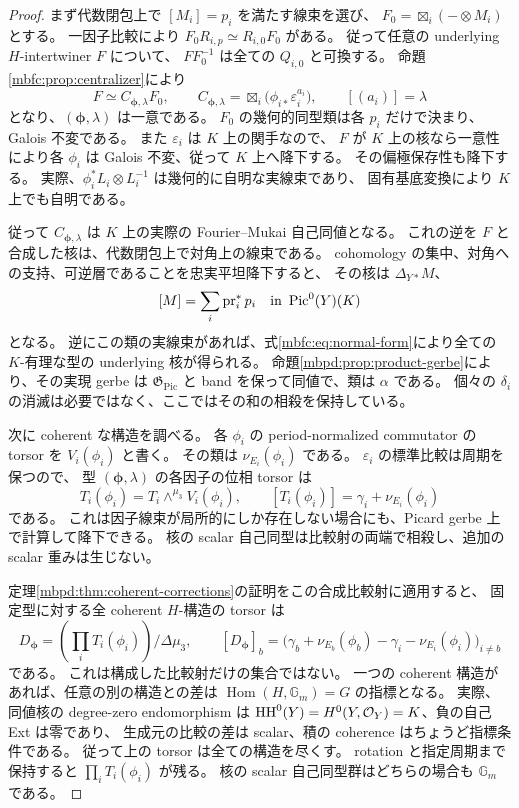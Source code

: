 \begin{proof}
まず代数閉包上で $[M_i]=p_i$ を満たす線束を選び、
$F_0=\boxtimes_i(-\otimes M_i)$ とする。
一因子比較により $F_0R_{i,p}\simeq R_{i,0}F_0$ がある。
従って任意の underlying $H$-intertwiner $F$ について、
$FF_0^{-1}$ は全ての $Q_{i,0}$ と可換する。
命題\ref{mbfc:prop:centralizer}により
\begin{equation}\label{mbfc:eq:normal-form}
 F\simeq C_{\boldsymbol\phi,\lambda}F_0,
 \qquad
 C_{\boldsymbol\phi,\lambda}
    =\boxtimes_i\bigl(\phi_{i*}\varepsilon_i^{a_i}\bigr),
 \qquad[(a_i)]=\lambda
\end{equation}
となり、$(\boldsymbol\phi,\lambda)$ は一意である。
$F_0$ の幾何的同型類は各 $p_i$ だけで決まり、Galois 不変である。
また $\varepsilon_i$ は $K$ 上の関手なので、
$F$ が $K$ 上の核なら一意性により各 $\phi_i$ は Galois 不変、従って $K$ 上へ降下する。
その偏極保存性も降下する。
実際、$\phi_i^*L_i\otimes L_i^{-1}$ は幾何的に自明な実線束であり、
固有基底変換により $K$ 上でも自明である。

従って $C_{\boldsymbol\phi,\lambda}$ は $K$ 上の実際の Fourier--Mukai 自己同値となる。
これの逆を $F$ と合成した核は、代数閉包上で対角上の線束である。
cohomology の集中、対角への支持、可逆層であることを忠実平坦降下すると、
その核は $\Delta_{Y*}M$、
\[
 [M]=\sum_i\operatorname{pr}_i^*p_i\quad\text{in }\operatorname{Pic}^0(Y)(K)
\]
となる。
逆にこの類の実線束があれば、式\eqref{mbfc:eq:normal-form}により全ての
$K$-有理な型の underlying 核が得られる。
命題\ref{mbpd:prop:product-gerbe}により、その実現 gerbe は
$\mathfrak G_{\mathrm{Pic}}$ と band を保って同値で、類は $\alpha$ である。
個々の $\delta_i$ の消滅は必要ではなく、ここではその和の相殺を保持している。

次に coherent な構造を調べる。
各 $\phi_i$ の period-normalized commutator の torsor を $V_i(\phi_i)$ と書く。
その類は $\nu_{E_i}(\phi_i)$ である。
$\varepsilon_i$ の標準比較は周期を保つので、
型 $(\boldsymbol\phi,\lambda)$ の各因子の位相 torsor は
\[
 T_i(\phi_i)=T_i\mathbin{\wedge^{\mu_3}}V_i(\phi_i),
 \qquad [T_i(\phi_i)]=\gamma_i+\nu_{E_i}(\phi_i)
\]
である。
これは因子線束が局所的にしか存在しない場合にも、Picard gerbe 上で計算して降下できる。
核の scalar 自己同型は比較射の両端で相殺し、追加の scalar 重みは生じない。

定理\ref{mbpd:thm:coherent-corrections}の証明をこの合成比較射に適用すると、
固定型に対する全 coherent $H$-構造の torsor は
\[
 D_{\boldsymbol\phi}
   =\left(\prod_i T_i(\phi_i)\right)/\Delta\mu_3,
 \qquad
 [D_{\boldsymbol\phi}]_b
   =\bigl(\gamma_b+\nu_{E_b}(\phi_b)
          -\gamma_i-\nu_{E_i}(\phi_i)\bigr)_{i\ne b}
\]
である。
これは構成した比較射だけの集合ではない。
一つの coherent 構造があれば、任意の別の構造との差は
$\operatorname{Hom}(H,\mathbb G_m)=G$ の指標となる。
実際、同値核の degree-zero endomorphism は
$\mathrm{HH}^0(Y)=H^0(Y,\mathcal O_Y)=K$、負の自己 Ext は零であり、
生成元の比較の差は scalar、積の coherence はちょうど指標条件である。
従って上の torsor は全ての構造を尽くす。
rotation と指定周期まで保持すると $\prod_iT_i(\phi_i)$ が残る。
核の scalar 自己同型群はどちらの場合も $\mathbb G_m$ である。


\end{proof}
